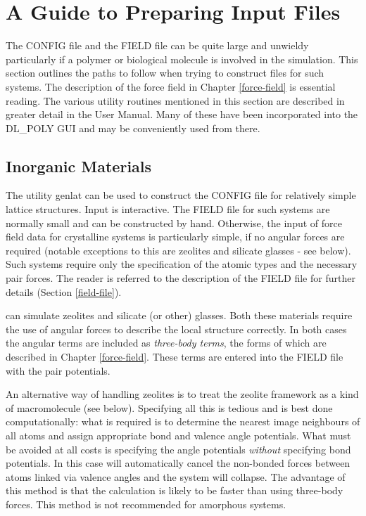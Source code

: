 \section{A Guide to Preparing Input Files}

The CONFIG file and the FIELD file can be quite large and unwieldy
particularly if a polymer or biological molecule is involved in the
simulation.  This section outlines the paths to follow when trying
to construct files for such systems.  The description of the \D
force field in Chapter \ref{force-field} is essential reading.  The
various utility routines mentioned in this section are described in
greater detail in the \C User Manual.  Many of these have been
incorporated into the DL\_POLY GUI \cite{smith-gui} and may
be conveniently used from there.

\subsection {Inorganic Materials}

The utility {\sc genlat} can be used to construct the CONFIG file
for relatively simple lattice structures.  Input is interactive. The
FIELD file for such systems are normally small and can be
constructed by hand.  Otherwise, the input of force field data for
crystalline systems is particularly simple, if no angular forces are
required (notable exceptions to this are zeolites and silicate
glasses - see below).  Such systems require only the specification
of the atomic types and the necessary pair forces.  The reader is
referred to the description of the \D FIELD file for further details
(Section \ref{field-file}).

\D can simulate zeolites and silicate (or other) glasses.  Both
these materials require the use of angular forces to describe the
local structure correctly.  In both cases the angular terms are
included as {\em three-body terms}, the forms of which are described
in Chapter \ref{force-field}.  These terms are entered into the
FIELD file with the pair potentials.

An alternative way of handling zeolites is to treat the zeolite
framework as a kind of macromolecule (see below).  Specifying all
this is tedious and is best done computationally: what is required
is to determine the nearest image neighbours of all atoms and assign
appropriate bond and valence angle potentials.  What must be avoided
at all costs is specifying the angle potentials {\em without}
specifying bond potentials.  In this case \D
will automatically cancel the non-bonded
forces between atoms linked via valence
angles and the system will collapse.
The advantage of this method is that the calculation is likely to be
faster than using three-body forces.
This method is not recommended for amorphous systems.

